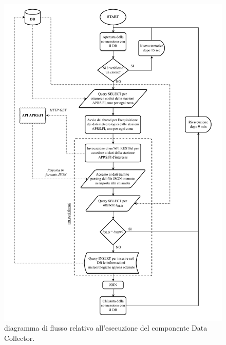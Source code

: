 \begin{figure}[h!]
	\centering
	\includegraphics[width=1\linewidth]{./Iterazione 3/OtherFiles/FC - Data collector}
	\caption{diagramma di flusso relativo all'esecuzione del componente Data Collector.}
	\label{fig:DCFlowChart}
\end{figure}